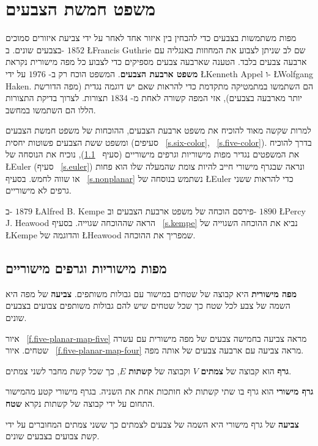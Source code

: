 


\chapter{משפט חמשת הצבעים}
\label{c.five}

מפות משתמשות בצבעים כדי להבחין בין איזור אחד לאחר על ידי צביעת איזורים סמוכים בצבעים שונים. ב-%
$1852$
\L{Francis Guthrie}
שם לב שניתן לצבוע את המחוזות באנגליה עם ארבעה צבעים בלבד. הטענה שארבעה צבעים מספיקים כדי לצבוע כל מפה מישורית נקראת 
\textbf{משפט ארבעת הצבעים}.
המשפט הוכח רק ב-%
$1976$
על ידי
\L{Kenneth Appel}
ו-%
\L{Wolfgang Haken}.
הם השתמשו במתמטיקה מתקדמת כדי להראות שאם יש דוגמה נגדית (מפה הדורשת יותר מארבעה בצבעים), אזי המפה קשורה לאחת מ-%
$1834$
תצורות. לצרוך בדיקת התצורות הללו הם השתמשו במחשב.

למרות שקשה מאוד להוכיח את משפט ארבעת הצבעים, ההוכחות של משפט חמשת הצבעים ומשפט ששת הצבעים פשוטות יחסית (סעיפים%
~\ref{s.six-color}, ~\ref{s.five-color}).
בדרך להוכיח את המשפטים נגדיר מפות מישוריות וגרפים מישוריים (סעיף%
~\ref{s.planar}),
נוכיח את הנוסחה של
\L{Euler}
(סעיף%
~\ref{s.euler})
ונראה שבגרף מישורי חייב להיות צומת שהמעלה שלו הוא פחות או שווה לחמש. בסעיף%
~\ref{s.nonplanar}
נשתמש בנוסחה של
\L{Euler}
כדי להראות ששני גרפים לא מישוריים.

ב-%
$1879$
\L{Alfred B. Kempe}
פירסם הוכחה של משפט ארבעת הצבעים וב-%
$1890$
\L{Percy J. Heawood}
הראה שההוכחה שגוייה. בסעיף%
~\ref{s.kempe}
נביא את ההוכחה השגוייה של 
\L{Kempe}
והדוגמה של
\L{Heawood}
שמפריך את ההוכחה.


\section{מפות מישוריות וגרפים מישוריים}\label{s.planar}

\begin{definition}
\textbf{מפה מישורית}
היא קבוצה של שטחים במישור עם גבולות משותפים.
\textbf{צביעה}
של מפה היא השמה של צבע לכל שטח כך שכל שטחים שיש להם גבולות  משותפים צבועים בצבעים שונים.
\end{definition}
איור%
~\ref{f.five-planar-map-five}
מראה צביעה בחמישה צבעים של מפה מישורית עם עשרה שטחים. איור%
~\ref{f.five-planar-map-four}
מראה צביעה עם ארבעה צבעים של אותה מפה.
\begin{definition}
\textbf{גרף}
הוא קבוצה של 
\textbf{צמתים}
$V$
וקבוצה של 
\textbf{קשתות}
$E$,
כך שכל קשת מחבר לשני צמתים.

\textbf{גרף מישורי}
הוא גרף בו שתי קשתות לא חותכות אחת את השניה. בגרף מישורי קטע מהמישור התחום על ידי קבוצה של קשתות נקרא 
\textbf{שטח}.

\textbf{צביעה}
של גרף מישורי היא השמה של צבעים לצמתים כך ששני צמתים המחוברים על ידי קשת צבועים בצבעים שונים.
\end{definition}



